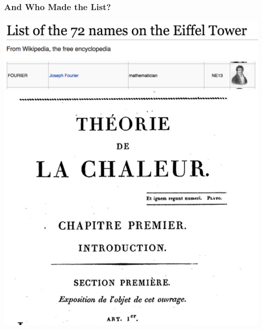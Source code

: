 \documentclass[mathserif,9pt]{beamer}
\begin{document}
\begin{frame}\frametitle{And Who Made the List?}\small
  \begin{center}
     \includegraphics[width=.9\textwidth]{F1.png}\hspace{1em} \\
     \includegraphics[width=.9\textwidth]{F2.png}\hspace{1em} \\
     \includegraphics[height=.4\textheight]{f3.png}\hspace{1em} 

\end{center}
\end{frame}
\end{document}
